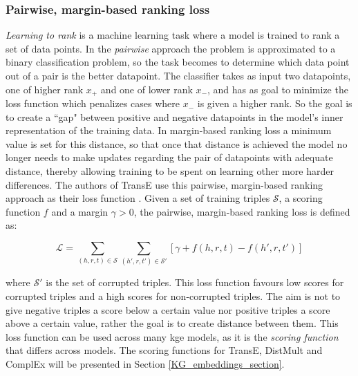 \subsubsection{Pairwise, margin-based ranking loss}
\textit{Learning to rank} is a machine learning task where a model is trained to rank a set of data points. In the \textit{pairwise} approach the problem is approximated to a binary classification problem, so the task becomes to determine which data point out of a pair is the better datapoint. The classifier takes as input two datapoints, one of higher rank $x_{+}$ and one of lower rank $x_{-}$, and has as goal to minimize the loss function which penalizes cases where $x_{-}$ is given a higher rank. So the goal is to create a ``gap" between positive and negative datapoints in the model's inner representation of the training data. In margin-based ranking loss a minimum value is set for this distance, so that once that distance is achieved the model no longer needs to make updates regarding the pair of datapoints with adequate distance, thereby allowing training to be spent on learning other more harder differences.  The authors of TransE use this pairwise, margin-based ranking approach as their loss function \cite{TransE}. Given a set of training triples $\mathcal{S}$, a scoring function $f$ and a margin $\gamma > 0$, the pairwise, margin-based ranking loss is defined as:

\[\mathcal{L}=\sum_{(h, r, t) \in \mathcal{S}}\sum_{(h', r, t') \in \mathcal{S'}}[\gamma + f(h, r, t) - f(h', r, t')]\]

where $\mathcal{S'}$ is the set of corrupted triples. This loss function favours low scores for corrupted triples and a high scores for non-corrupted triples. The aim is not to give negative triples a score below a certain value nor positive triples a score above a certain value, rather the goal is to create distance between them. This loss function can be used across many \gls{kge} models, as it is the \textit{scoring function} that differs across models. The scoring functions for TransE, DistMult and ComplEx will be presented in Section \ref{KG_embeddings_section}.


